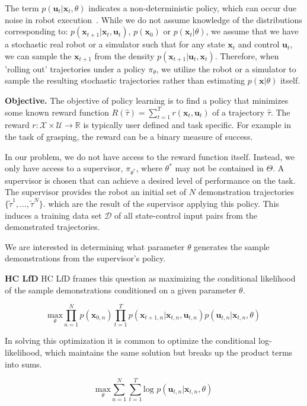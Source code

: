 \documentclass[10pt, conference]{ieeeconf}      %
\newcommand{\bu}{\mathbf{u}}
\newcommand{\bx}{\mathbf{x}}
\newcommand{\ns}{HC LfD }
\begin{document}
The term $p(\bu_t|\bx_t,\theta)$ indicates a non-deterministic policy, which can occur due noise in robot execution~\cite{mahler2014learning}. While we do not assume knowledge of the distributions corresponding to: $p(\bx_{t+1}|\bx_t,\bu_t)$, $p(\bx_0)$ or $p(\bx_t|
\theta)$, we assume that we have a stochastic real robot or a simulator such that for any state
$\bx_t$ and control $\bu_t$, we can sample the $\bx_{t+1}$ from the density $p(\bx_{t+1}|\bu_t,\bx_t)$. 
Therefore, when 'rolling out' trajectories under a policy
$\pi_{\theta}$, we utilize the robot or a simulator to sample the resulting stochastic trajectories rather than
estimating $p(\bx|\theta)$ itself.


\noindent\textbf{Objective.} The objective of policy learning is to find a policy that minimizes some known reward function $R(\hat{\tau}) = \sum^T_{t=1} r(\bx_t,\bu_t)$ of a trajectory $\hat{\tau}$. The reward $r:\mathcal{X}\times \mathcal{U}\to \mathbb{R}$ is typically user defined and task specific. 
For example in the task of grasping, the reward can be a binary measure of success.

In our problem, we do not have access to the reward function itself. Instead, we only have access to 
a supervisor, $\pi_{\theta^*}$, where $\theta^*$ may not be contained in $\Theta$. A supervisor is chosen that can achieve a desired level of performance on the task. The supervisor provides the robot an initial set
of $N$   demonstration trajectories $\lbrace \tilde{\tau}^1,...,\tilde{\tau}^N \rbrace$. 
which are the result of the supervisor applying this policy. This induces a training data set $\mathcal{D}$ of all state-control input pairs from the demonstrated trajectories.

We are interested in determining what parameter $\theta$ generates the sample demonstrations from the supervisor's policy. 

\noindent \textbf{\ns} \ns frames this  question as maximizing the conditional likelihood of the sample demonstrations conditioned on a given parameter $\theta$. 

$$\underset{\theta}{\mbox{max}} \prod^N_{n=1} p(\bx_{0,n}) \prod^T_{t=1} p(\bx_{t+1,n}|\bx_{t,n},\bu_{t,n})p(\bu_{t,n}|\bx_{t,n},\theta)$$

In solving this optimization it is common to optimize the conditional log-likelihood, which maintains the same solution but breaks up the product terms into sums. 

\begin{equation}\label{eq:m_likeli_obj}
\underset{\theta}{\mbox{max}} \sum^N_{n=1}\sum^T_{t=1}\mbox{log }p(\bu_{t,n}|\bx_{t,n},\theta)
\end{equation}
\end{document}
